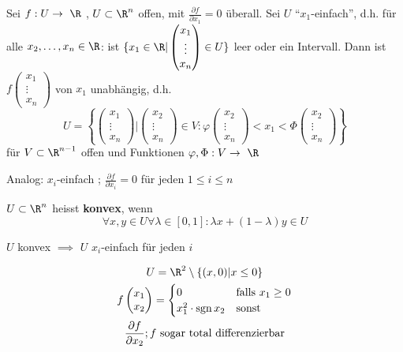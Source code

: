 \begin{satz*}
	Sei $f: U \rightarrow \R$ , $U \subset \R^n$ offen, mit $\frac{\partial f}{\partial x_1} = 0$ überall. Sei $U$ \enquote{$x_1$-einfach}, d.h. für alle $x_2 , \dotsc , x_n \in \R$: ist $\{ x_1 \in \R | \begin{pmatrix} x_1 \\ \vdots \\ x_n \end{pmatrix} \in U \}$ leer oder ein Intervall. Dann ist $f\begin{pmatrix} x_1 \\ \vdots \\ x_n \end{pmatrix}$ von $x_1$ unabhängig, d.h.
	\[ U = \left\{ \begin{pmatrix} x_1 \\ \vdots \\ x_n \end{pmatrix} | \begin{pmatrix} x_2 \\ \vdots \\ x_n \end{pmatrix} \in V : \varphi\begin{pmatrix} x_2 \\ \vdots \\ x_n \end{pmatrix} < x_1 < \Phi\begin{pmatrix} x_2 \\ \vdots \\ x_n \end{pmatrix} \right\} \]
	für $V \subset \R^{n-1}$ offen und Funktionen $\varphi , \Phi : V \rightarrow \R$
	
	Analog: $x_i$-einfach ; $\frac{\partial f}{\partial x_i} = 0$ für jeden $1 \leq i \leq n$
\end{satz*}
\begin{bem}
	$U \subset \R^n$ heisst \textbf{konvex}, wenn
	\[ \forall x, y \in U \forall \lambda \in [ 0 , 1 ] : \lambda x + ( 1 - \lambda ) y \in U \]
\end{bem}
\begin{bem}
	$U$ konvex $\implies$ $U$ $x_i$-einfach für jeden $i$
\end{bem}
\begin{bsp*}
	\begin{gather*}
		U = \R^2 \setminus \{ (x,0) | x \leq 0 \} \\
		f\begin{pmatrix} x_1 \\ x_2 \end{pmatrix} = \begin{cases}
			0				&\text{falls } x_1 \geq 0	\\
			x_1^2 \cdot \sgn x_2	&\text{sonst}
		\end{cases} \\
		\frac{\partial f}{\partial x_2} ; f \text{ sogar total differenzierbar}
	\end{gather*}
\end{bsp*}
